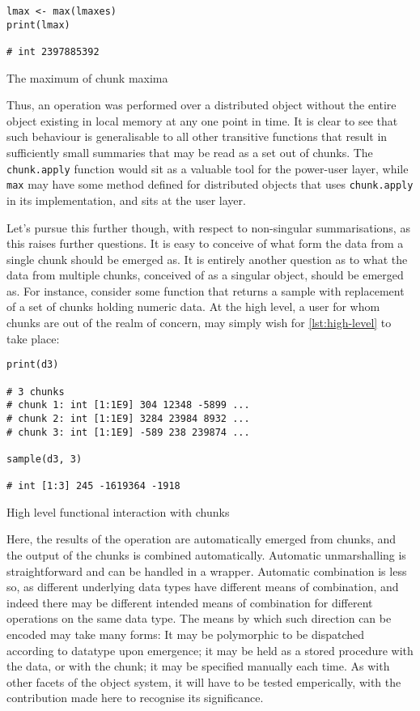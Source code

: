 \begin{listing}
    \begin{verbatim}
lmax <- max(lmaxes)
print(lmax)

# int 2397885392
    \end{verbatim}
    \caption{The maximum of chunk maxima}
    \label{lst:total-max}
\end{listing}

Thus, an operation was performed over a distributed object without the
entire object existing in local memory at any one point in time. It is
clear to see that such behaviour is generalisable to all other
transitive functions that result in sufficiently small summaries that
may be read as a set out of chunks. The \texttt{chunk.apply} function
would sit as a valuable tool for the power-user layer, while
\texttt{max} may have some method defined for distributed objects that
uses \texttt{chunk.apply} in its implementation, and sits at the user
layer.

Let's pursue this further though, with respect to non-singular
summarisations, as this raises further questions. It is easy to conceive
of what form the data from a single chunk should be emerged as. It is
entirely another question as to what the data from multiple chunks,
conceived of as a singular object, should be emerged as. For instance,
consider some function that returns a sample with replacement of a set
of chunks holding numeric data. At the high level, a user for whom
chunks are out of the realm of concern, may simply wish for \ref{lst:high-level} to take place:

\begin{listing}
    \begin{verbatim}
print(d3)

# 3 chunks
# chunk 1: int [1:1E9] 304 12348 -5899 ...
# chunk 2: int [1:1E9] 3284 23984 8932 ...
# chunk 3: int [1:1E9] -589 238 239874 ...

sample(d3, 3)

# int [1:3] 245 -1619364 -1918
    \end{verbatim}
    \caption{High level functional interaction with chunks}
    \label{lst:high-level}
\end{listing}

Here, the results of the operation are automatically emerged from
chunks, and the output of the chunks is combined automatically.
Automatic unmarshalling is straightforward and can be handled in a
wrapper. Automatic combination is less so, as different underlying data
types have different means of combination, and indeed there may be
different intended means of combination for different operations on the
same data type. The means by which such direction can be encoded may
take many forms: It may be polymorphic to be dispatched according to
datatype upon emergence; it may be held as a stored procedure with the
data, or with the chunk; it may be specified manually each time. As with
other facets of the object system, it will have to be tested
emperically, with the contribution made here to recognise its
significance.

